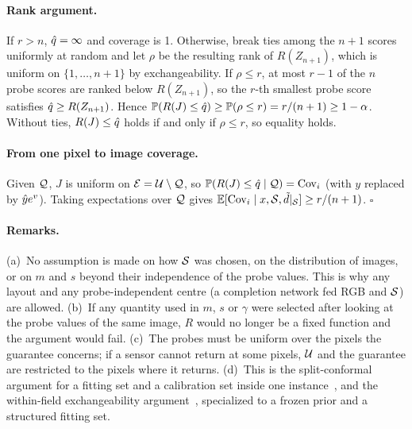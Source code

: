 \paragraph{Rank argument.}
If $r>n$, $\hat{q}=\infty$ and coverage is 1.
Otherwise, break ties among the $n+1$ scores uniformly at random and let $\rho$ be the resulting rank of $R(Z_{n+1})$, which is uniform on $\{1,\dots,n+1\}$ by exchangeability.
If $\rho\le r$, at most $r-1$ of the $n$ probe scores are ranked below $R(Z_{n+1})$, so the $r$-th smallest probe score satisfies $\hat{q}\ge R(Z_{n+1})$.
Hence $\mathbb{P}(R(J)\le\hat{q})\ge\mathbb{P}(\rho\le r)=r/(n+1)\ge1-\alpha$.
Without ties, $R(J)\le\hat{q}$ holds if and only if $\rho\le r$, so equality holds.

\paragraph{From one pixel to image coverage.}
Given $\mathcal{Q}$, $J$ is uniform on $\mathcal{E}=\mathcal{U}\setminus\mathcal{Q}$, so $\mathbb{P}(R(J)\le\hat{q}\mid\mathcal{Q})=\mathrm{Cov}_i$ (with $y$ replaced by $\hat{y} e^{v}$).
Taking expectations over $\mathcal{Q}$ gives $\mathbb{E}[\mathrm{Cov}_i\mid x,\mathcal{S},\tilde{d}|_{\mathcal{S}}]\ge r/(n+1)$. \hfill$\square$

\paragraph{Remarks.}
(a)~No assumption is made on how $\mathcal{S}$ was chosen, on the distribution of images, or on $m$ and $s$ beyond their independence of the probe values.
This is why any layout and any probe-independent centre (\eg a completion network fed RGB and $\mathcal{S}$) are allowed.
(b)~If any quantity used in $m$, $s$ or $\gamma$ were selected after looking at the probe values of the same image, $R$ would no longer be a fixed function and the argument would fail.
(c)~The probes must be uniform over the pixels the guarantee concerns; if a sensor cannot return at some pixels, $\mathcal{U}$ and the guarantee are restricted to the pixels where it returns.
(d)~This is the split-conformal argument for a fitting set and a calibration set inside one instance~\cite{gui2023cmc}, and the within-field exchangeability argument~\cite{mao2024spatial}, specialized to a frozen prior and a structured fitting set.

